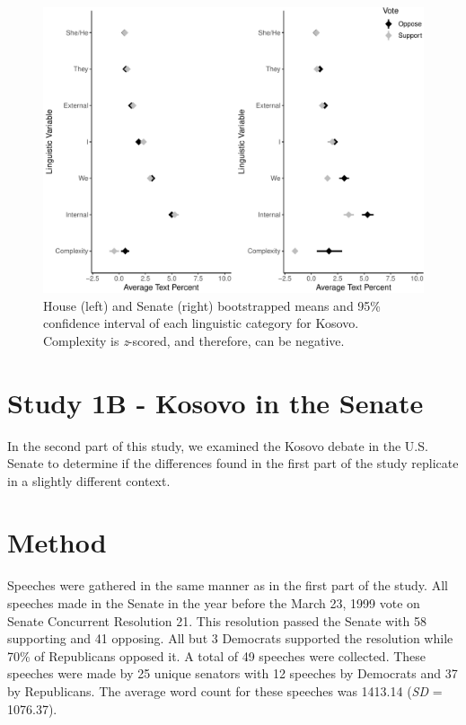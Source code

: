 \documentclass[english,,man]{apa6}
\begin{document}
\begin{figure}
\centering
\includegraphics{Language-of-War-Markdown_KJ2_files/figure-latex/Kpic-1.pdf}
\caption{\label{fig:Kpic}House (left) and Senate (right) bootstrapped means and 95\% confidence interval of each linguistic category for Kosovo. Complexity is \emph{z}-scored, and therefore, can be negative.}
\end{figure}

\hypertarget{study-1b---kosovo-in-the-senate}{%
\section{Study 1B - Kosovo in the Senate}\label{study-1b---kosovo-in-the-senate}}

In the second part of this study, we examined the Kosovo debate in the U.S. Senate to determine if the differences found in the first part of the study replicate in a slightly different context.

\hypertarget{method-1}{%
\section{Method}\label{method-1}}

Speeches were gathered in the same manner as in the first part of the study. All speeches made in the Senate in the year before the March 23, 1999 vote on Senate Concurrent Resolution 21. This resolution passed the Senate with 58 supporting and 41 opposing. All but 3 Democrats supported the resolution while 70\% of Republicans opposed it. A total of 49 speeches were collected. These speeches were made by 25 unique senators with 12 speeches by Democrats and 37 by Republicans. The average word count for these speeches was 1413.14 (\emph{SD} = 1076.37).
\end{document}
